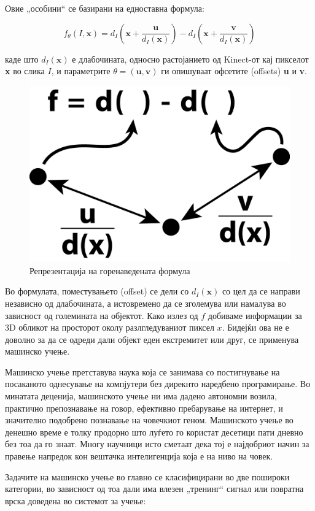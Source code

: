 \documentclass[12pt]{article}
\begin{document}
	Овие „особини“ се базирани на едноставна формула:

  \begin{equation}
	  f_\theta(I,\textbf{x}) = d_I(\textbf{x}+\frac{\textbf{u}}{d_I(\textbf{x})}) - d_I(\textbf{x}+\frac{\textbf{v}}{d_I(\textbf{x})})
    \end{equation}

  каде што $d_I(\textbf{x})$ е длабочината, односно растојанието од Kinect-от кај пикселот \textbf{x} во слика $I$, и параметрите $\theta = (\textbf{u},\textbf{v})$ ги опишуваат офсетите (offsets) \textbf{u} и \textbf{v}.

  \begin{figure}[H]
	  \includegraphics[width=0.35\linewidth]{./images/kinectfeature.png}
		\centering
		\caption{Репрезентација на горенаведената формула}
		\label{fig:kinectfeature.png}
	  \end{figure}

	Во формулата, поместувањето (offset) се дели со $d_I(\textbf{x})$ со цел да се направи независно од длабочината, а истовремено да се зголемува или намалува во зависност од големината на објектот. Како излез од $f$ добиваме информации за 3D обликот на просторот околу разлгледуваниот пиксел $x$. Бидејќи ова не е доволно за да се одреди дали објект еден екстремитет или друг, се применува машинско учење.

	Машинско учење претставува наука која се занимава со постигнување на посаканото однесување на компјутери без дирекнто наредбено програмирање. Во минатата деценија, машинското учење ни има дадено автономни возила, практично препознавање на говор, ефективно пребарување на интернет, и значително подобрено познавање на човечкиот геном. Машинското учење во денешно време е толку продорно што луѓето го користат десетици пати дневно без тоа да го знаат. Многу научници исто сметаат дека тој е најдобриот начин за правење напредок кон вештачка интелигенција која е на ниво на човек.

	Задачите на машинско учење во главно се класифицирани во две пошироки категории, во зависност од тоа дали има влезен „тренинг“ сигнал или повратна врска доведена во системот за учење:
\end{document}
